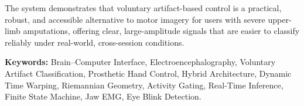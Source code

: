 \documentclass[12pt, a4paper, twoside]{report}
\begin{document}
The system demonstrates that voluntary artifact-based control is a
practical, robust, and accessible alternative to motor imagery for
users with severe upper-limb amputations, offering clear,
large-amplitude signals that are easier to classify reliably under
real-world, cross-session conditions.

\bigskip
\noindent\textbf{Keywords:}
Brain--Computer Interface,
Electroencephalography,
Voluntary Artifact Classification,
Prosthetic Hand Control,
Hybrid Architecture,
Dynamic Time Warping,
Riemannian Geometry,
Activity Gating,
Real-Time Inference,
Finite State Machine,
Jaw EMG,
Eye Blink Detection.

\newpage

\tableofcontents
\newpage

\listoffigures
{}
\newpage

\listoftables
{}
\newpage

\printglossary[type=\acronymtype, title=List of Abbreviations,
               toctitle=List of Abbreviations]
\newpage





\end{document}
